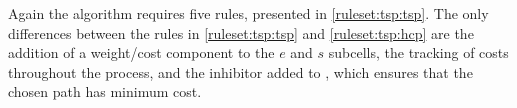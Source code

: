     
    
    

Again the algorithm requires five rules, presented in \cref{ruleset:tsp:tsp}.  The only differences between the rules in \cref{ruleset:tsp:tsp} and \cref{ruleset:tsp:hcp} are the addition of a weight/cost component to the \(e\) and \(s\) subcells, the tracking of costs throughout the process, and the \gls{inhibitor} added to , which ensures that the chosen path has minimum cost.

